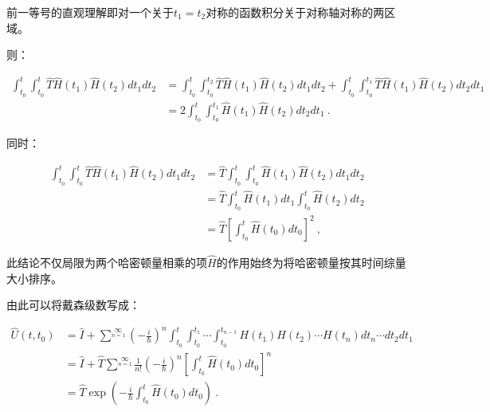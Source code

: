 前一等号的直观理解即对一个关于$t_1=t_2$对称的函数积分关于对称轴对称的两区域。

则：

\begin{align}
\int^t_{t_0}\int^{t}_{t_0}\hat T\hat H(t_1)\hat H(t_2)dt_1dt_2 &= 
\int^t_{t_0}\int^{t_2}_{t_0}\hat T\hat H(t_1)\hat H(t_2)dt_1dt_2+\int^t_{t_0}\int^{t_1}_{t_0}\hat T\hat H(t_1)\hat H(t_2)dt_2dt_1 \\ 
&= 2\int^t_{t_0}\int^{t_1}_{t_0}\hat H(t_1)\hat H(t_2)dt_2dt_1~.
\end{align}

同时：

\begin{align}
\int^t_{t_0}\int^{t}_{t_0}\hat T\hat H(t_1)\hat H(t_2)dt_1dt_2 &= \hat T\int^t_{t_0}\int^{t}_{t_0}\hat H(t_1)\hat H(t_2)dt_1dt_2 \\&= \hat T\int^{t}_{t_0}\hat H(t_1)dt_1\int^t_{t_0}\hat H(t_2)dt_2\\&=\hat T\left[\int^t_{t_0}\hat H(t_0)dt_0\right]^2 ~,
\end{align}

此结论不仅局限为两个哈密顿量相乘的项$\hat H$的作用始终为将哈密顿量按其时间综量大小排序。

由此可以将戴森级数写成：


\begin{align}
\hat U (t,t_0) &=\hat I +\sum\limits^{\infty}\limits_{n=1}(-\frac{i}{\hbar})^n\int^{t}_{t_0}\int^{t_1}_{t_0}\cdots\int^{t_{n-1}}_{t_0}H(t_1)H(t_2)\cdots H(t_n)dt_n\cdots dt_2dt_1 \\
&=\hat I +\hat T \sum\limits^{\infty}\limits_{n=1}\frac{1}{n!}(-\frac{i}{\hbar})^n \left[\int^t_{t_0}\hat H(t_0)dt_0\right]^n \\
&=\hat T \exp(-\frac{i}{\hbar}\int^t_{t_0}\hat H(t_0)dt_0)~.
\end{align}
